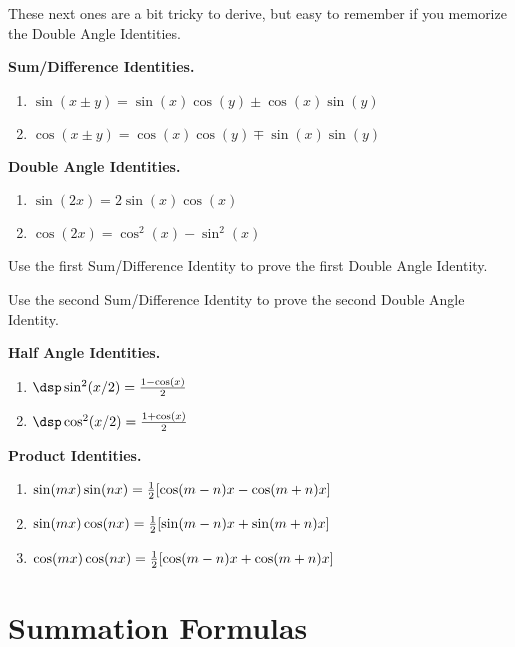 These next ones are a bit tricky to derive, but easy to remember if you memorize the Double Angle Identities.

\begin{thm} \textbf{Sum/Difference Identities.}
\begin{enumerate}
\item $\sin(x \pm y) = \sin(x)\cos(y) \pm \cos(x)\sin(y)$
\item $\cos(x \pm y) = \cos(x)\cos(y) \mp \sin(x)\sin(y)$
\end{enumerate}
\end{thm}

\begin{thm} \textbf{Double Angle Identities.}
\begin{enumerate}
\item $\sin(2x) = 2\sin(x)\cos(x)$
\item $\cos(2x) = \cos^2(x) - \sin^2(x)$
\end{enumerate}
\end{thm}

\begin{prb}
Use the first Sum/Difference Identity to prove the first Double Angle Identity.
\end{prb}

\begin{prb}
Use the second Sum/Difference Identity to prove the second Double Angle Identity.
\end{prb}

\begin{thm} \textbf{Half Angle Identities.}
\begin{enumerate}
\item $\dsp \sin^2(x/2) = \frac{1-\cos(x)}{2}$
\item $\dsp \cos^2(x/2) = \frac{1+\cos(x)}{2}$
\end{enumerate}
\end{thm}

\begin{thm} \textbf{Product Identities.}
\begin{enumerate}
\item $\sin(mx) \sin(nx)={1 \over 2}[ \cos(m-n)x- \cos(m+n)x]$
\item $\sin(mx) \cos(nx)={1 \over 2}[\sin(m-n)x+ \sin(m+n)x]$
\item $\cos(mx) \cos(nx)={1 \over 2}[\cos(m-n)x+ \cos(m+n)x]$
\end{enumerate}
\end{thm}

\section{Summation Formulas} \label{appsum}

